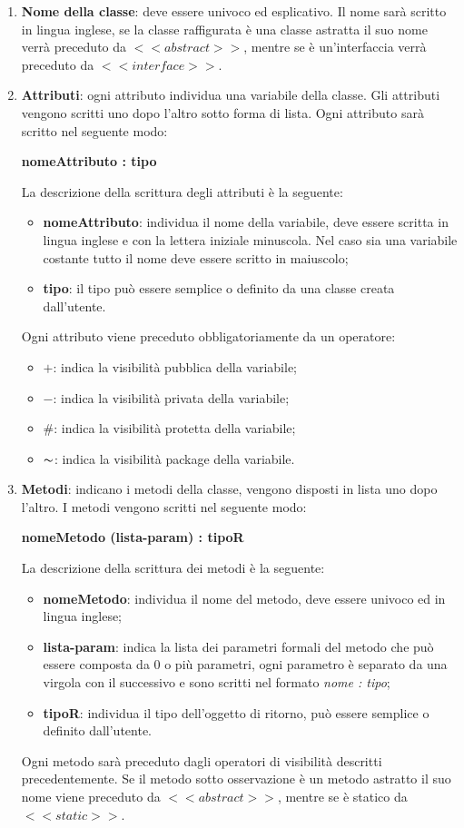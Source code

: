 \begin{enumerate}
	\item \textbf{Nome della classe}: deve essere univoco ed esplicativo. Il nome sarà scritto in lingua inglese, se la classe raffigurata è una classe astratta il suo nome verrà preceduto da $<<abstract>>$, mentre se è un'interfaccia verrà preceduto da $<<interface>>$.
	\item \textbf{Attributi}: ogni attributo individua una variabile della classe. Gli attributi vengono scritti uno dopo l'altro sotto forma di lista. Ogni attributo sarà scritto nel seguente modo:
	\begin{center}
		\textbf{nomeAttributo : tipo}
	\end{center}
	La descrizione della scrittura degli attributi è la seguente:
	\begin{itemize}
		\item \textbf{nomeAttributo}: individua il nome della variabile, deve essere scritta in lingua inglese e con la lettera iniziale minuscola. Nel caso sia una variabile costante tutto il nome deve essere scritto in maiuscolo;
		\item \textbf{tipo}: il tipo può essere semplice o definito da una classe creata dall'utente.
	\end{itemize}
	Ogni attributo viene preceduto obbligatoriamente da un operatore:
	\begin{itemize}
		\item \textbf{$+$}: indica la visibilità pubblica della variabile;
		\item \textbf{$-$}: indica la visibilità privata della variabile;
		\item \textbf{$\#$}: indica la visibilità protetta della variabile;
		\item \textbf{$\thicksim$}: indica la visibilità package della variabile.
	\end{itemize}
	\item \textbf{Metodi}: indicano i metodi della classe, vengono disposti in lista uno dopo l'altro. I metodi vengono scritti nel seguente modo:
	\begin{center}
		\textbf{nomeMetodo (lista-param) : tipoR}
	\end{center}
	La descrizione della scrittura dei metodi è la seguente:
	\begin{itemize}
		\item \textbf{nomeMetodo}: individua il nome del metodo, deve essere univoco ed in lingua inglese;
		\item \textbf{lista-param}: indica la lista dei parametri formali del metodo che può essere composta da 0 o più parametri, ogni parametro è separato da una virgola con il successivo e sono scritti nel formato \textit{nome : tipo};
		\item \textbf{tipoR}: individua il tipo dell'oggetto di ritorno, può essere semplice o definito dall'utente.
	\end{itemize}
	Ogni metodo sarà preceduto dagli operatori di visibilità descritti precedentemente. Se il metodo sotto osservazione è un metodo astratto il suo nome viene preceduto da $<<abstract>>$, mentre se è statico da $<<static>>$.
\end{enumerate}
